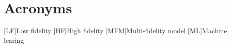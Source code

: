 \chapter*{Acronyms}

\begin{acronym}[UML]
  [LF]{Low fidelity}
  [HF]{High fidelity}
  [MFM]{Multi-fidelity model}
  [ML]{Machine learing}
\end{acronym}